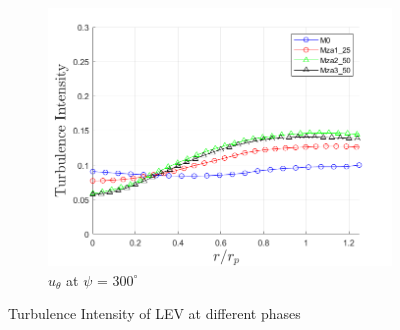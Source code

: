 \begin{figure}[H]
\begin{subfigure}[b]{0.475\textwidth}
		\centering
		\includegraphics[width=1\textwidth]{figures/zonal_adapt_results/LEV/u_theta/TI_phase_300.png}
		\caption{$u_\theta$ at $\psi$ = $300^\circ$}
		\label{fig:zonal_TI_300}
	\end{subfigure}
	\label{fig:zonal_TI_plots_LEV}
	\caption{ Turbulence Intensity of LEV at different phases}
\end{figure}

